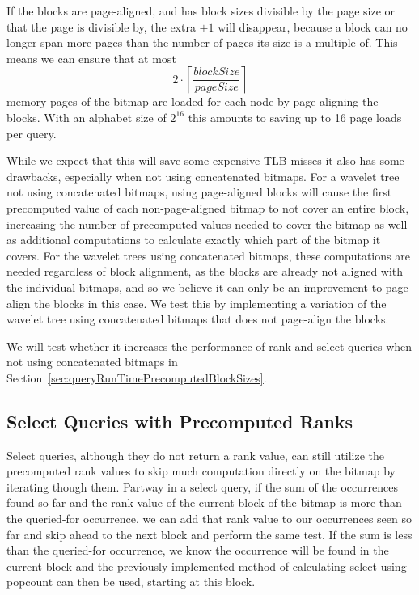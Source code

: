 If the blocks are page-aligned, and has block sizes divisible by the page size or that the page is divisible by, the extra $+1$ will disappear, because a block can no longer span more pages than the number of pages its size is a multiple of.
This means we can ensure that at most \[2 \cdot \left\lceil\frac{\mathit{blockSize}}{\mathit{pageSize}}\right\rceil\] memory pages of the bitmap are loaded for each node by page-aligning the blocks.
With an alphabet size of $2^{16}$ this amounts to saving up to 16 page loads per query.

While we expect that this will save some expensive TLB misses it also has some drawbacks, especially when not using concatenated bitmaps.
For a wavelet tree not using concatenated bitmaps, using page-aligned blocks will cause the first precomputed value of each non-page-aligned bitmap to not cover an entire block, increasing the number of precomputed values needed to cover the bitmap as well as additional computations to calculate exactly which part of the bitmap it covers.
For the wavelet trees using concatenated bitmaps, these computations are needed regardless of block alignment, as the blocks are already not aligned with the individual bitmaps, and so we believe it can only be an improvement to page-align the blocks in this case.
We test this by implementing a variation of the wavelet tree using concatenated bitmaps that does not page-align the blocks.

We will test whether it increases the performance of rank and select queries when not using concatenated bitmaps in Section~\ref{sec:queryRunTimePrecomputedBlockSizes}.


\subsection{Select Queries with Precomputed Ranks}
Select queries, although they do not return a rank value, can still utilize the precomputed rank values to skip much computation directly on the bitmap by iterating though them.
Partway in a select query, if the sum of the occurrences found so far and the rank value of the current block of the bitmap is more than the queried-for occurrence, we can add that rank value to our occurrences seen so far and skip ahead to the next block and perform the same test.
If the sum is less than the queried-for occurrence, we know the occurrence will be found in the current block and the previously implemented method of calculating select using popcount can then be used, starting at this block.


